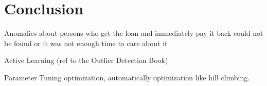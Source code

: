 \chapter{Conclusion}\label{Chapter:7}

Anomalies about persons who get the loan and immediately  pay it back could not be found or it was not enough time to care about it 

Active Learning (ref to the Outlier Detection Book)

Parameter Tuning optimization, automatically optimization like hill climbing.





